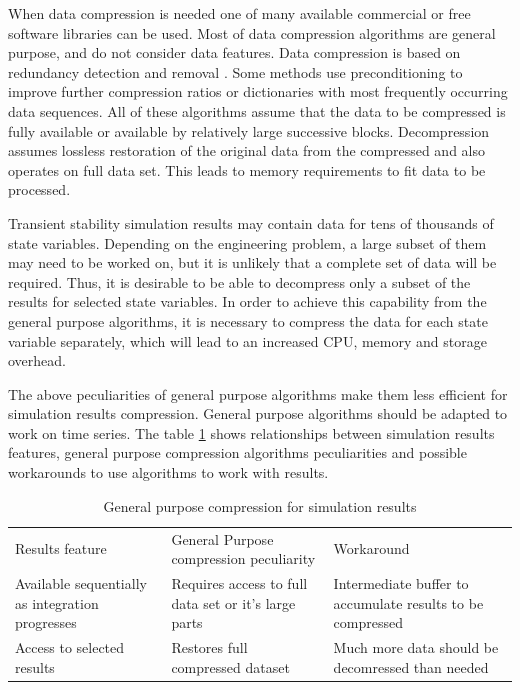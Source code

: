 \documentclass[lettersize,journal]{IEEEtran}
\begin{document}
When data compression is needed one of many available commercial or free software libraries can be used.
Most of data compression algorithms are general purpose, and do not consider data features.
Data compression is based on redundancy detection and removal \cite{lzw77,welch84}. 
Some methods use preconditioning to improve further compression ratios \cite{bwt94} or dictionaries 
with most frequently occurring data sequences.  All of these algorithms assume that the data to be compressed is
fully available or available by relatively large successive blocks. Decompression assumes 
lossless restoration of the original data from the compressed and also operates on full data set. 
This leads to memory requirements to fit data to be processed.

Transient stability simulation results may contain data for tens of thousands of state variables.
Depending on the engineering problem, a large subset of them may need to be worked on, but it is unlikely that a complete set of data will be required.
Thus, it is desirable to be able to decompress only a subset of the results for selected state variables. 
In order to achieve this capability from the general purpose algorithms, it is necessary to compress the data for each 
state variable separately, which will lead to an increased CPU, memory and storage overhead.

The above peculiarities of general purpose algorithms make them less efficient for simulation 
results compression. General purpose algorithms should be adapted to work on time series. 
The table \ref{tab:gpcompr} shows relationships between simulation results features, general purpose
compression algorithms peculiarities and possible workarounds to use algorithms to work with
results.

\begin{table}[!h]
	\caption{General purpose compression for simulation results\label{tab:gpcompr}}
	\centering
	\begin{tabularx}{\columnwidth}{ 
			  >{\raggedright\arraybackslash}X 
			| >{\raggedright\arraybackslash}X 
			| >{\raggedright\arraybackslash}X }
		\hline
		Results feature & General Purpose compression peculiarity & Workaround\\
		\hlineB{3}	
		Available sequentially as integration progresses & 
		Requires access to full data set or it's large parts  &
		Intermediate buffer to accumulate results to be compressed\\
		\hline
		Access to selected results & 
		Restores full compressed dataset & 
		Much more data should be decomressed than needed\\
		\hline
	\end{tabularx}
\end{table}
\end{document}
